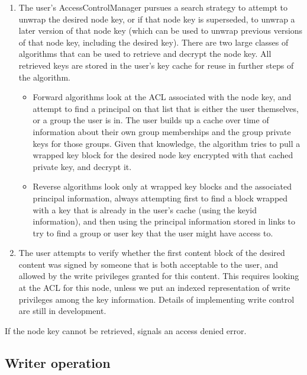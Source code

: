 \begin{enumerate}
\item The user's AccessControlManager pursues a search strategy to
  attempt to unwrap the desired node key, or if that node key is
  superseded, to unwrap a later version of that node key (which can be
  used to unwrap previous versions of that node key, including the
  desired key). There are two large classes of algorithms that can be
  used to retrieve and decrypt the node key. All retrieved keys are
  stored in the user's key cache for reuse in further steps of the
  algorithm.
  \begin{itemize}
  \item Forward algorithms look at the ACL associated with the node
    key, and attempt to find a principal on that list that is either
    the user themselves, or a group the user is in. The user builds up
    a cache over time of information about their own group memberships
    and the group private keys for those groups. Given that knowledge,
    the algorithm tries to pull a wrapped key block for the desired
    node key encrypted with that cached private key, and decrypt it.

  \item Reverse algorithms look only at wrapped key blocks and the
    associated principal information, always attempting first to find
    a block wrapped with a key that is already in the user's cache
    (using the keyid information), and then using the principal
    information stored in links to try to find a group or user key
    that the user might have access to.
  \end{itemize}

\item The user attempts to verify whether the first content block of
  the desired content was signed by someone that is both acceptable to
  the user, and allowed by the write privileges granted for this
  content. This requires looking at the ACL for this node, unless we
  put an indexed representation of write privileges among the key
  information. Details of implementing write control are still in
  development.
\end{enumerate}

If the node key cannot be retrieved, signals an access denied error. 

\subsection{Writer operation}


